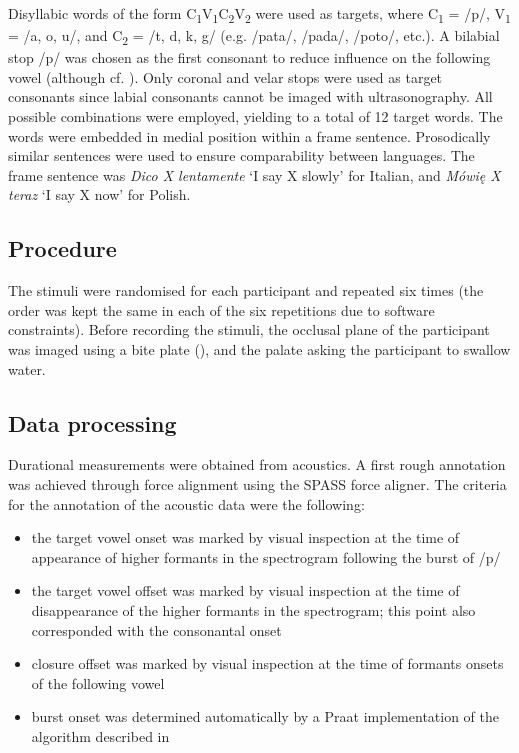 \documentclass[]{elsarticle}
\providecommand{\tightlist}{%
  \setlength{\itemsep}{0pt}\setlength{\parskip}{0pt}}
\begin{document}
Disyllabic words of the form
C\textsubscript{1}V\textsubscript{1}C\textsubscript{2}V\textsubscript{2}
were used as targets, where C\textsubscript{1} = /p/, V\textsubscript{1}
= /a, o, u/, and C\textsubscript{2} = /t, d, k, g/ (e.g. /pata/, /pada/,
/poto/, etc.). A bilabial stop /p/ was chosen as the first consonant to
reduce influence on the following vowel (although cf.
\citet{vazquez-alvarez2007}). Only coronal and velar stops were used as
target consonants since labial consonants cannot be imaged with
ultrasonography. All possible combinations were employed, yielding to a
total of 12 target words. The words were embedded in medial position
within a frame sentence. Prosodically similar sentences were used to
ensure comparability between languages. The frame sentence was
\emph{Dico X lentamente} `I say X slowly' for Italian, and \emph{Mówię X
teraz} `I say X now' for Polish.

\subsection{Procedure}\label{procedure}

The stimuli were randomised for each participant and repeated six times
(the order was kept the same in each of the six repetitions due to
software constraints). Before recording the stimuli, the occlusal plane
of the participant was imaged using a bite plate (), and the palate
asking the participant to swallow water.

\subsection{Data processing}\label{data-processing}

Durational measurements were obtained from acoustics. A first rough
annotation was achieved through force alignment using the SPASS force
aligner. The criteria for the annotation of the acoustic data were the
following:

\begin{itemize}
\tightlist
\item
  the target vowel onset was marked by visual inspection at the time of
  appearance of higher formants in the spectrogram following the burst
  of /p/
\item
  the target vowel offset was marked by visual inspection at the time of
  disappearance of the higher formants in the spectrogram; this point
  also corresponded with the consonantal onset
\item
  closure offset was marked by visual inspection at the time of formants
  onsets of the following vowel
\item
  burst onset was determined automatically by a Praat implementation of
  the algorithm described in \citet{ananthapadmanabha2014}
\end{itemize}
\end{document}
